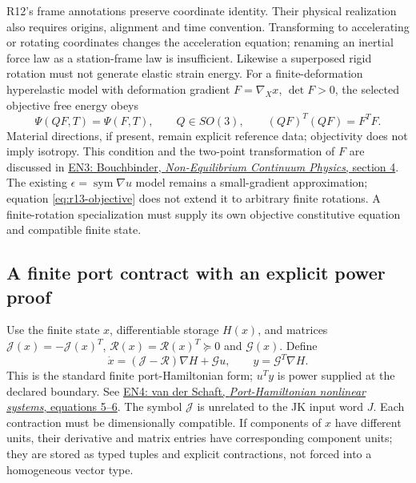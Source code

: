 R12's frame annotations preserve coordinate identity. Their physical
realization also requires origins, alignment and time convention. Transforming
to accelerating or rotating coordinates changes the acceleration equation;
renaming an inertial force law as a station-frame law is insufficient.
Likewise a superposed rigid rotation must not generate elastic strain energy.
For a finite-deformation hyperelastic model with deformation gradient
$F=\nabla_X x$, $\det F>0$, the selected objective free energy obeys
\begin{equation}
 \Psi(QF,T)=\Psi(F,T),\qquad Q\in SO(3),
 \qquad (QF)^T(QF)=F^TF .
 \label{eq:r13-objective}
\end{equation}
Material directions, if present, remain explicit reference data; objectivity
does not imply isotropy. This condition and the two-point transformation of
$F$ are discussed in
\href{https://www.weizmann.ac.il/chemphys/bouchbinder/sites/chemphys.bouchbinder/files/uploads/Courses/2019/Lectures/ContinuumPhysics_1-10_2019.pdf}
{EN3: Bouchbinder, \emph{Non-Equilibrium Continuum Physics}, section 4}.
The existing $\epsilon=\operatorname{sym}\nabla u$ model remains a small-gradient
approximation; equation \eqref{eq:r13-objective} does not extend it to arbitrary
finite rotations. A finite-rotation specialization must supply its own
objective constitutive equation and compatible finite state.

\subsection{A finite port contract with an explicit power proof}
Use the finite state $x$, differentiable storage $H(x)$, and matrices
$\mathcal J(x)=-\mathcal J(x)^T$, $\mathcal R(x)=\mathcal R(x)^T\succeq0$
and $\mathcal G(x)$. Define
\begin{equation}
 \dot x=(\mathcal J-\mathcal R)\nabla H+\mathcal G u,
 \qquad y=\mathcal G^T\nabla H .
 \label{eq:r13-port}
\end{equation}
This is the standard finite port-Hamiltonian form; $u^Ty$ is power supplied
at the declared boundary. See
\href{https://arxiv.org/html/2412.19673v1#S1.SS1}
{EN4: van der Schaft, \emph{Port-Hamiltonian nonlinear systems}, equations 5--6}.
The symbol $\mathcal J$ is unrelated to the JK input word $J$.
Each contraction must be dimensionally compatible. If components of $x$ have
different units, their derivative and matrix entries have corresponding
component units; they are stored as typed tuples and explicit contractions,
not forced into a homogeneous vector type.

